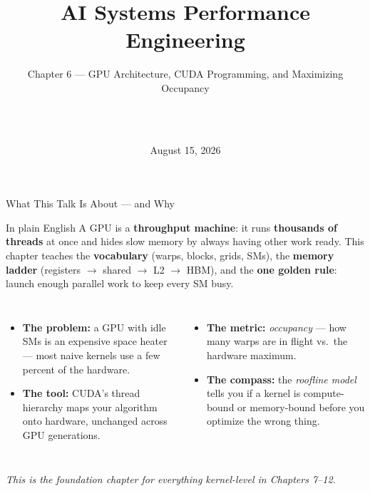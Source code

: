 \documentclass[aspectratio=169]{beamer}
\title[AI Systems Performance Engineering]{AI Systems Performance Engineering}
\subtitle{Chapter 6 --- GPU Architecture, CUDA Programming, and Maximizing Occupancy}
\author[\PresenterName\ \ \PresenterTitle\ \ \PresenterOrg]{\PresenterName\\\PresenterTitle\\\PresenterOrg}
\institute[]{\footnotesize Internal Training for Applied Scientists on AI Infrastructure}
\date{August 15, 2026}
\newcommand{\kw}[1]{\textbf{\textcolor{kwblue}{#1}}}
\begin{document}
\begin{frame}
  \titlepage
\end{frame}

\begin{frame}{What This Talk Is About --- and Why}
  \begin{block}{In plain English}
    A GPU is a \kw{throughput machine}: it runs \kw{thousands of threads} at once and hides slow memory by
    always having other work ready. This chapter teaches the \kw{vocabulary} (warps, blocks, grids, SMs),
    the \kw{memory ladder} (registers $\to$ shared $\to$ L2 $\to$ HBM), and the \kw{one golden rule}:
    launch enough parallel work to keep every SM busy.
  \end{block}
  \begin{columns}[t]
    \begin{itemize}
      \item \kw{The problem:} a GPU with idle SMs is an expensive space heater --- most naive kernels
            use a few percent of the hardware.
      \item \kw{The tool:} CUDA's thread hierarchy maps your algorithm onto hardware, unchanged across GPU generations.
    \end{itemize}
    \begin{itemize}
      \item \kw{The metric:} \emph{occupancy} --- how many warps are in flight vs.\ the hardware maximum.
      \item \kw{The compass:} the \emph{roofline model} tells you if a kernel is compute-bound or memory-bound
            before you optimize the wrong thing.
    \end{itemize}
  \end{columns}
  \medskip
  \centering\footnotesize\itshape
  This is the foundation chapter for everything kernel-level in Chapters 7--12.
\end{frame}
\end{document}
